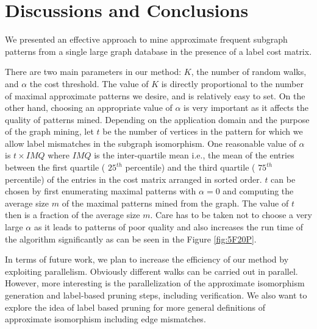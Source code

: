 \section{Discussions and Conclusions}

We presented an effective approach to mine approximate frequent subgraph
patterns from a single large graph database in the presence of
a label cost matrix.

There are two main parameters in our method: $K$, the number of random
walks, and $\alpha$ the cost threshold. The value of $K$ is directly
proportional to the number of maximal approximate patterns we desire,
and is relatively easy to set.
On the other hand, choosing an appropriate value of
$\alpha$ is very important as it affects the quality of
patterns mined. Depending on the application domain
and the purpose of the graph mining, let $t$ be the number of
vertices in the pattern for which we allow label mismatches
in the subgraph isomorphism. One reasonable value of
$\alpha$ is $t \times IMQ$ where $IMQ$ is the inter-quartile mean
i.e., the mean of the entries between the first quartile ( $25^{th}$
percentile) and the third quartile ( $75^{th}$ percentile)
of the entries in the cost matrix arranged in sorted order. 
$t$ can be chosen by first
enumerating maximal patterns with $\alpha = 0$ and computing the 
average size $m$ of the maximal patterns mined from the graph.
The value of $t$ then is a fraction of the average size $m$.
Care has to be taken not to choose a very large $\alpha$ as it leads to
patterns of poor quality and also increases the run time of the
algorithm significantly as can be seen in the Figure \ref{fig:5F20P}.

In terms of future work, we plan to increase the efficiency of our
method by exploiting parallelism. Obviously different walks can be
carried out in parallel. However, more interesting is the
parallelization of the approximate isomorphism generation and
label-based pruning steps, including verification. We also
want to explore the idea of label based pruning for more
general definitions of approximate isomorphism including 
edge mismatches.

